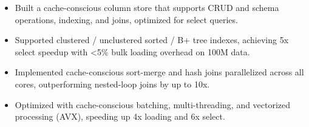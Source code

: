 


\begin{itemize}[nosep]
  \item Built a cache-conscious column store that supports CRUD and schema operations, indexing, and joins, optimized for select queries.
  \item Supported clustered / unclustered sorted / B+ tree indexes, achieving 5x select speedup with <5\% bulk loading overhead on 100M data.
  \item Implemented cache-conscious sort-merge and hash joins parallelized across all cores, outperforming nested-loop joins by up to 10x.
  \item Optimized with cache-conscious batching, multi-threading, and vectorized processing (AVX), speeding up 4x loading and 6x select.
\end{itemize}
